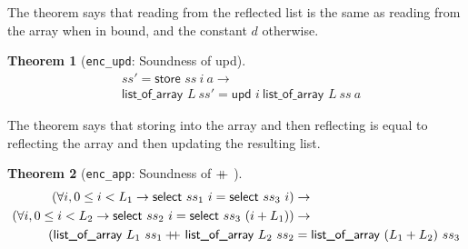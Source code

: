\documentclass[onecolumn, preprint]{sigplanconf}
\newcommand{\select}[2]{\textsf{select } #1\ #2}
\newcommand{\store}[3]{\textsf{store } #1\ #2\ #3}
\newcommand{\loa}[2]{\textsf{list\_of\_array } #1\ #2}
\newcommand{\unth}[3]{\textsf{upd } #1\ #2\ #3}
\newcommand{\codeinl}[1]{\texttt{#1}}
\newcommand\doubleplus{+\kern-1.3ex+\kern0.8ex}
\newtheorem{theorem}{Theorem}
\begin{document}
The theorem says that reading from the reflected list is the same as reading from the array when in bound, and the constant $d$ otherwise. %

\begin{theorem}[\texttt{enc\_upd}: Soundness of \textsf{upd}]
  \begin{align*}
  & ss' = \store{ss}{i}{a} \to \\
  &  \loa{L}{ss'} = \unth{i}{\loa{L}{ss}}{a}
\end{align*}
\end{theorem}

The theorem says that storing into the array and then reflecting is equal to reflecting the array and then updating the resulting list.

\begin{theorem}[\texttt{enc\_app}: Soundness of $\doubleplus$]
\begin{align*}
(\forall i, 0 \leq i < L_1 \to \select{ss_1}{i} = \select{ss_3}{i}) &\to \\
  (\forall i, 0 \leq i < L_2 \to \select{ss_2}{i} = \select{ss_3}{(i + L_1)}) &\to  \\
  (\loa{L_1}{ss_1} \doubleplus \loa{L_2}{ss_2} &= \loa{(L_1 + L_2)}{ss_3}
\end{align*}
\end{theorem}
\end{document}
